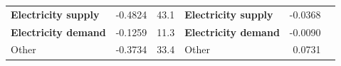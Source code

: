 \begin{tabular}{lrrlrr}
{\bfseries \hspace*{7.5pt} Electricity supply} & -0.4824 & 43.1 & {\bfseries \hspace*{7.5pt} Electricity supply} & -0.0368 &  \\
{\bfseries \hspace*{7.5pt} Electricity demand} & -0.1259 & 11.3 & {\bfseries \hspace*{7.5pt} Electricity demand} & -0.0090 &  \\
\hspace*{7.5pt} Other & -0.3734 & 33.4 & \hspace*{7.5pt} Other & 0.0731 &  \\
\bottomrule
\end{tabular}
